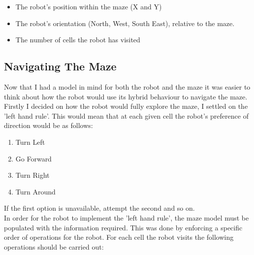 \documentclass[a4paper]{article}
\begin{document}
	\begin{itemize}
		\item The robot's position within the maze (X and Y)
		\item The robot's orientation (North, West, South East), relative to the maze.
		\item The number of cells the robot has visited\\
	\end{itemize}
	
	
	\subsection{Navigating The Maze}
	Now that I had a model in mind for both the robot and the maze it was easier to think about how the robot would use its hybrid behaviour to navigate the maze. Firstly I decided on how the robot would fully explore the maze, I settled on the 'left hand rule'. This would mean that at each given cell the robot's preference of direction would be as follows:\\
	
	\begin{enumerate}
		\item Turn Left
		\item Go Forward
		\item Turn Right
		\item Turn Around\\
	\end{enumerate}
	
	If the first option is unavailable, attempt the second and so on.\\ 
	
	In order for the robot to implement the 'left hand rule', the maze model must be populated with the information required. This was done by enforcing a specific order of operations for the robot. For each cell the robot visits the following operations should be carried out:
	
	\newpage
	
\end{document}
